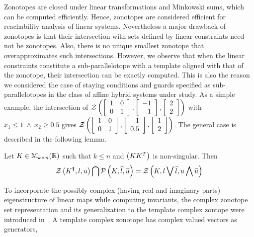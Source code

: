 Zonotopes are closed under linear transformations and Minkowski sums, which can be computed efficiently.  Hence, zonotopes are
considered efficient for reachability analysis of linear systems.  Nevertheless
a major drawback of zonotopes is that their intersection with sets defined by linear
constraints need not be zonotopes.  Also, there is no unique smallest
zonotope that overapproximates such intersections.  However, we observe that when the linear constraints
constitute a sub-parallelotope with a template aligned with that of
the zonotope, their intersection can be exactly computed.  This is
also the reason we considered the case of staying conditions and guards specified as sub-parallelotopes 
in the class of affine hybrid systems under study.  As a simple example, the intersection of
$\mathcal{Z}\left(\left[\begin{array}{l l}1 & 0 \\ 0 &
      1\end{array}\right],\left[\begin{array}{c}-1\\ -1\end{array}\right],\left[\begin{array}{c}2\\ 2\end{array}\right]\right)$
with $x_1\leq 1~\wedge~x_2\geq 0.5$ gives $\mathcal{Z}\left(\left[\begin{array}{l
        l}1 & 0 \\ 0 &
      1\end{array}\right],\left[\begin{array}{c}-1\\ 0.5\end{array}\right],\left[\begin{array}{c}1\\ 2\end{array}\right]\right)$.
The general case is described in the following lemma.
%
\begin{lemma}\label{lem:motivation}
Let $K\in\mathbb{M}_{k\times n}(\mathbb{R})$ such that $k\leq n$ and $\left(KK^T\right)$ is
non-singular.  Then
\[
\mathcal{Z}\left(K^{\bm{\dagger}},l,u\right) \bigcap \mathcal{P}\left(K,\widehat{l},\widehat{u}\right)
= \mathcal{Z}\left(K,l\bigvee \widehat{l},u\bigwedge \widehat{u}\right)
\]
\end{lemma}
%
To incorporate the possibly complex (having real and imaginary parts)
eigenstructure of linear maps while computing invariants, the complex
zonotope set representation and its generalization to the template
complex zontope were introduced in~\cite{adimoolam2016using,tcz2017}.
A template complex zonotope has complex valued vectors as generators,
